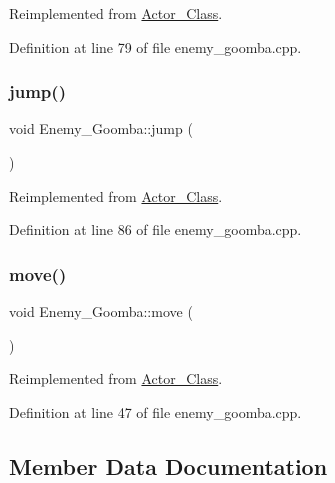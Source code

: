 Reimplemented from \hyperlink{class_actor___class_ac49cd62be76b4b950ecbe155413f1b64}{Actor\+\_\+\+Class}.



Definition at line 79 of file enemy\+\_\+goomba.\+cpp.

\hypertarget{class_enemy___goomba_ab07621304a0b92c4559679071c060439}{}\label{class_enemy___goomba_ab07621304a0b92c4559679071c060439} 
\subsubsection{\texorpdfstring{jump()}{jump()}}
{\footnotesize\ttfamily void Enemy\+\_\+\+Goomba\+::jump (\begin{DoxyParamCaption}{ }\end{DoxyParamCaption})\hspace{0.3cm}{\ttfamily [virtual]}}



Reimplemented from \hyperlink{class_actor___class_ab33216a3ce0c856bdc16231c71ae35c2}{Actor\+\_\+\+Class}.



Definition at line 86 of file enemy\+\_\+goomba.\+cpp.

\hypertarget{class_enemy___goomba_a0b72ff73bb4f64d4c659a5142862fd1f}{}\label{class_enemy___goomba_a0b72ff73bb4f64d4c659a5142862fd1f} 
\subsubsection{\texorpdfstring{move()}{move()}}
{\footnotesize\ttfamily void Enemy\+\_\+\+Goomba\+::move (\begin{DoxyParamCaption}{ }\end{DoxyParamCaption})\hspace{0.3cm}{\ttfamily [virtual]}}



Reimplemented from \hyperlink{class_actor___class_af1764a94c5410ba8476f56553cd2c327}{Actor\+\_\+\+Class}.



Definition at line 47 of file enemy\+\_\+goomba.\+cpp.



\subsection{Member Data Documentation}
\hypertarget{class_enemy___goomba_a6e754ed916291f62f4ece73a30903f68}{}\label{class_enemy___goomba_a6e754ed916291f62f4ece73a30903f68} 
